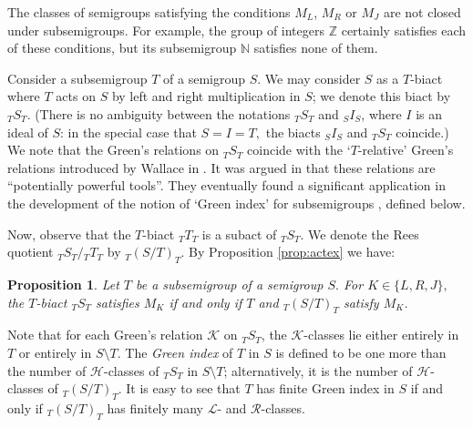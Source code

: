 \documentclass[twoside,a4paper,12pt,reqno]{amsart}
\theoremstyle{plain}
\newtheorem{prop}[thm]{Proposition}
\theoremstyle{definition}
\renewcommand{\l}{\mbox{${\mathcal{L}}$}}
\renewcommand{\r}{\mbox{${\mathcal{R}}$}}
\newcommand{\h}{\mbox{${\mathcal{H}}$}}
\renewcommand{\k}{\mbox{${\mathcal{K}}$}}
\newcommand{\N}{\mathbb{N}}
\newcommand{\Z}{\mathbb{Z}}
\newcommand{\sm}{\setminus}
\begin{document}
The classes of semigroups satisfying the conditions $M_L$, $M_R$ or $M_J$ are not closed under subsemigroups.  For example, the group of integers $\Z$ certainly satisfies each of these conditions, but its subsemigroup $\N$ satisfies none of them.

Consider a subsemigroup $T$ of a semigroup $S.$  We may consider $S$ as a $T$-biact where $T$ acts on $S$ by left and right multiplication in $S$; we denote this biact by ${_T}S_T$.  (There is no ambiguity between the notations ${_T}S_T$ and ${_S}I_S$, where $I$ is an ideal of $S$: in the special case that $S=I=T,$ the biacts ${_S}I_S$ and ${_T}S_T$ coincide.)  We note that the Green's relations on ${_T}S_T$ coincide with the `$T$-relative' Green's relations introduced by Wallace in \cite{Wallace}.  It was argued in \cite[Section 10.4]{Arbib} that these relations are ``potentially powerful tools''.  They eventually found a significant application in the development of the notion of `Green index' for subsemigroups \cite{Cain,Gray}, defined below.

Now, observe that the $T$-biact ${_T}T_T$ is a subact of ${_T}S_T$.  We denote the Rees quotient ${_T}S_T/{_T}T_T$ by ${_T}(S/T)_T$.  By Proposition \ref{prop:actex} we have:

\begin{prop}\label{prop:subsemigroup}
Let $T$ be a subsemigroup of a semigroup $S.$  For $K\in\{L,R,J\},$ the $T$-biact ${_T}S_T$ satisfies $M_K$ if and only if $T$ and ${_T}(S/T)_T$ satisfy $M_K$.
\end{prop}

Note that for each Green's relation $\k$ on ${_T}S_T$, the $\k$-classes lie either entirely in $T$ or entirely in $S{\sm}T.$  The {\em Green index} of $T$ in $S$ is defined to be one more than the number of $\h$-classes of ${_T}S_T$ in $S{\sm}T$; alternatively, it is the number of $\h$-classes of ${_T}(S/T)_T$.  It is easy to see that $T$ has finite Green index in $S$ if and only if ${_T}(S/T)_T$ has finitely many $\l$- and $\r$-classes.

\end{document}

